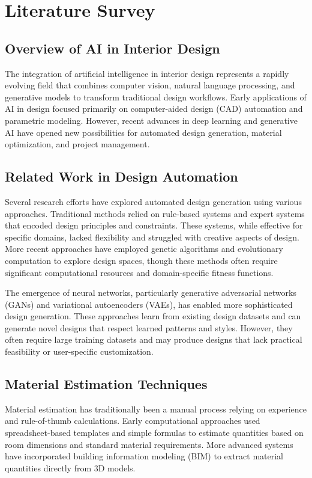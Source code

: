 \documentclass[conference]{IEEEtran}
\begin{document}
\section{Literature Survey}

\subsection{Overview of AI in Interior Design}
The integration of artificial intelligence in interior design represents a rapidly evolving field that combines computer vision, natural language processing, and generative models to transform traditional design workflows. Early applications of AI in design focused primarily on computer-aided design (CAD) automation and parametric modeling. However, recent advances in deep learning and generative AI have opened new possibilities for automated design generation, material optimization, and project management.

\subsection{Related Work in Design Automation}
Several research efforts have explored automated design generation using various approaches. Traditional methods relied on rule-based systems and expert systems that encoded design principles and constraints. These systems, while effective for specific domains, lacked flexibility and struggled with creative aspects of design. More recent approaches have employed genetic algorithms and evolutionary computation to explore design spaces, though these methods often require significant computational resources and domain-specific fitness functions.

The emergence of neural networks, particularly generative adversarial networks (GANs) and variational autoencoders (VAEs), has enabled more sophisticated design generation. These approaches learn from existing design datasets and can generate novel designs that respect learned patterns and styles. However, they often require large training datasets and may produce designs that lack practical feasibility or user-specific customization.

\subsection{Material Estimation Techniques}
Material estimation has traditionally been a manual process relying on experience and rule-of-thumb calculations. Early computational approaches used spreadsheet-based templates and simple formulas to estimate quantities based on room dimensions and standard material requirements. More advanced systems have incorporated building information modeling (BIM) to extract material quantities directly from 3D models.
\end{document}
